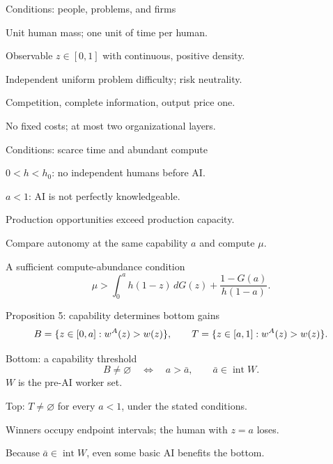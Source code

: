 \documentclass[aspectratio=169,12pt]{beamer}
\begin{document}
\begin{frame}{Conditions: people, problems, and firms}
\begin{points}
\item Unit human mass; one unit of time per human.
\item Observable $z\in[0,1]$ with continuous, positive density.
\item Independent uniform problem difficulty; risk neutrality.
\item Competition, complete information, output price one.
\item No fixed costs; at most two organizational layers.
\end{points}
\end{frame}

\begin{frame}{Conditions: scarce time and abundant compute}
\begin{points}
\item $0<h<h_0$: no independent humans before AI.
\item $a<1$: AI is not perfectly knowledgeable.
\item Production opportunities exceed production capacity.
\item Compare autonomy at the same capability $a$ and compute $\mu$.
\end{points}
\begin{block}{A sufficient compute-abundance condition}
\[\mu>\int_0^a h(1-z)\,dG(z)+\frac{1-G(a)}{h(1-a)}.\]
\end{block}
\end{frame}

\begin{frame}{Proposition 5: capability determines bottom gains}
\[B=\{z\in[0,a]:w^{A}(z)>w(z)\},\qquad
T=\{z\in[a,1]:w^{A}(z)>w(z)\}.\]
\begin{block}{Bottom: a capability threshold}
\[B\ne\varnothing\quad\Longleftrightarrow\quad a>\bar a,
\qquad \bar a\in\operatorname{int}W.\]
$W$ is the pre-AI worker set.
\end{block}
\begin{points}
\item Top: $T\ne\varnothing$ for every $a<1$, under the stated conditions.
\item Winners occupy endpoint intervals; the human with $z=a$ loses.
\item Because $\bar a\in\operatorname{int}W$, even some basic AI benefits the bottom.
\end{points}
\end{frame}
\end{document}
